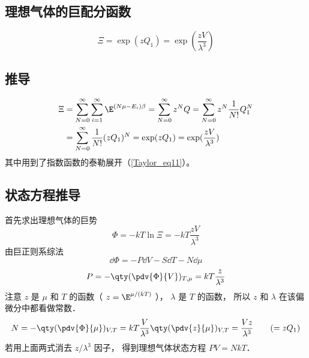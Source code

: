 
\subsection{理想气体的巨配分函数}
\begin{equation}\label{IdMCE_eq1}
\Xi  = \exp(z Q_1) = \exp(\frac{zV}{\lambda^3})
\end{equation}
\subsection{推导}
\begin{equation}\label{IdMCE_eq2}
\begin{aligned}
\Xi & = \sum_{N = 0}^\infty  \sum_{i = 1}^\infty  \E^{(N\mu - E_i)\beta}  = \sum_{N = 0}^\infty  z^N Q
 = \sum_{N = 0}^\infty  z^N \frac{1}{N!}Q_1^N \\
& = \sum_{N=0}^\infty  \frac{1}{N!} (z Q_1)^N
= \exp(z Q_1) = \exp(\frac{zV}{\lambda^3})
\end{aligned}
\end{equation}
其中用到了指数函数的泰勒展开（\autoref{Taylor_eq11}）。

\subsection{状态方程推导}
首先求出理想气体的巨势
\begin{equation}\label{IdMCE_eq4}
\Phi  =  - kT\ln \Xi  =  - kT\frac{zV}{\lambda ^3}
\end{equation}
由巨正则系综法
\begin{equation}\label{IdMCE_eq5}
\dd{\Phi} =  - P\dd{V} - S\dd{T} - N\dd{\mu}
\end{equation}
\begin{equation}\label{IdMCE_eq6}
P = - \qty(\pdv{\Phi}{V})_{T, \mu} = kT\frac{z}{\lambda ^3}
\end{equation}
注意 $z$ 是 $\mu $ 和 $T$ 的函数（ $z = \E^{\mu/(kT)}$ ）， $\lambda $ 是 $T$ 的函数， 所以 $z$ 和 $\lambda $ 在该偏微分中都看做常数．
\begin{equation}\label{IdMCE_eq7}
N = - \qty(\pdv{\Phi}{\mu})_{V,T} = kT\frac{V}{\lambda^3} \qty(\pdv{z}{\mu})_{V,T} = \frac{Vz}{\lambda ^3} 
\qquad ( = z{Q_1})
\end{equation}
若用上面两式消去 $z/\lambda^3$ 因子， 得到理想气体状态方程 $PV = NkT$．
  
